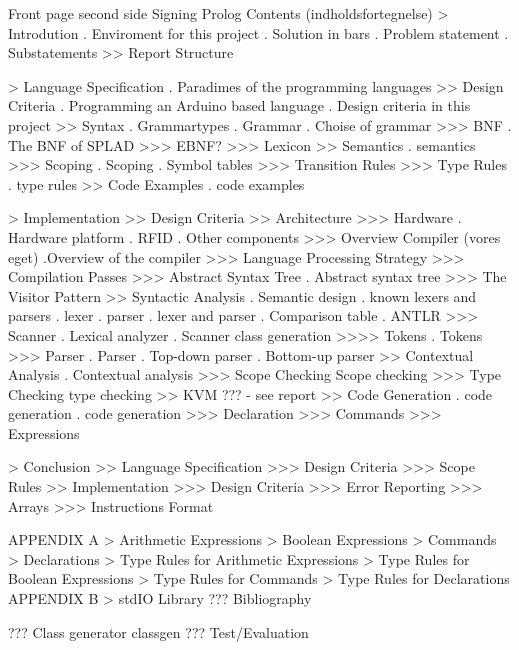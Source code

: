 Front page
second side
Signing
Prolog
Contents (indholdsfortegnelse)
> Introdution
. Enviroment for this project
. Solution in bars
. Problem statement
. Substatements
>> Report Structure

> Language Specification
. Paradimes of the programming languages
>> Design Criteria
. Programming an Arduino based language
. Design criteria in this project
>> Syntax
. Grammartypes
. Grammar
. Choise of grammar
>>> BNF
. The BNF of SPLAD
>>> EBNF?
>>> Lexicon
>> Semantics
. semantics
>>> Scoping
. Scoping
. Symbol tables
>>> Transition Rules
>>> Type Rules
. type rules
>> Code Examples
. code examples

> Implementation
>> Design Criteria
>> Architecture
>>> Hardware
. Hardware platform
. RFID
. Other components
>>> Overview Compiler (vores eget)
.Overview of the compiler
>>> Language Processing Strategy
>>> Compilation Passes
>>> Abstract Syntax Tree
. Abstract syntax tree
>>> The Visitor Pattern
>> Syntactic Analysis
. Semantic design
. known lexers and parsers
. lexer
. parser
. lexer and parser
. Comparison table
. ANTLR
>>> Scanner
. Lexical analyzer
. Scanner class generation
>>>> Tokens
. Tokens
>>> Parser
. Parser
. Top-down parser
. Bottom-up parser
>> Contextual Analysis
. Contextual analysis
>>> Scope Checking
Scope checking
>>> Type Checking
type checking
>> KVM ??? - see report
>> Code Generation
. code generation
. code generation
>>> Declaration
>>> Commands
>>> Expressions

> Conclusion
>> Language Specification
>>> Design Criteria
>>> Scope Rules
>> Implementation
>>> Design Criteria
>>> Error Reporting
>>> Arrays
>>> Instructions Format

APPENDIX A
> Arithmetic Expressions
> Boolean Expressions
> Commands
> Declarations
> Type Rules for Arithmetic Expressions
> Type Rules for Boolean Expressions
> Type Rules for Commands
> Type Rules for Declarations
APPENDIX B
> stdIO Library ???
Bibliography


??? Class generator classgen
??? Test/Evaluation